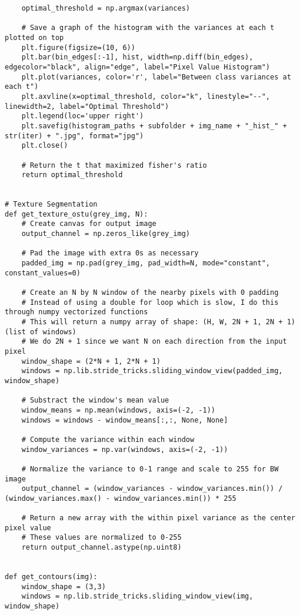\documentclass{article}
\begin{document}
\begin{lstlisting}
    optimal_threshold = np.argmax(variances)
        
    # Save a graph of the histogram with the variances at each t plotted on top
    plt.figure(figsize=(10, 6))
    plt.bar(bin_edges[:-1], hist, width=np.diff(bin_edges), edgecolor="black", align="edge", label="Pixel Value Histogram")
    plt.plot(variances, color='r', label="Between class variances at each t")
    plt.axvline(x=optimal_threshold, color="k", linestyle="--", linewidth=2, label="Optimal Threshold")
    plt.legend(loc='upper right')
    plt.savefig(histogram_paths + subfolder + img_name + "_hist_" + str(iter) + ".jpg", format="jpg")
    plt.close()
    
    # Return the t that maximized fisher's ratio
    return optimal_threshold


# Texture Segmentation
def get_texture_ostu(grey_img, N):
    # Create canvas for output image
    output_channel = np.zeros_like(grey_img)
    
    # Pad the image with extra 0s as necessary
    padded_img = np.pad(grey_img, pad_width=N, mode="constant", constant_values=0)
    
    # Create an N by N window of the nearby pixels with 0 padding
    # Instead of using a double for loop which is slow, I do this through numpy vectorized functions
    # This will return a numpy array of shape: (H, W, 2N + 1, 2N + 1) (list of windows)
    # We do 2N + 1 since we want N on each direction from the input pixel
    window_shape = (2*N + 1, 2*N + 1)
    windows = np.lib.stride_tricks.sliding_window_view(padded_img, window_shape)
    
    # Substract the window's mean value
    window_means = np.mean(windows, axis=(-2, -1))
    windows = windows - window_means[:,:, None, None]
    
    # Compute the variance within each window
    window_variances = np.var(windows, axis=(-2, -1))
    
    # Normalize the variance to 0-1 range and scale to 255 for BW image
    output_channel = (window_variances - window_variances.min()) / (window_variances.max() - window_variances.min()) * 255

    # Return a new array with the within pixel variance as the center pixel value
    # These values are normalized to 0-255
    return output_channel.astype(np.uint8)


def get_contours(img):
    window_shape = (3,3)
    windows = np.lib.stride_tricks.sliding_window_view(img, window_shape)
    

\end{lstlisting}
\end{document}
